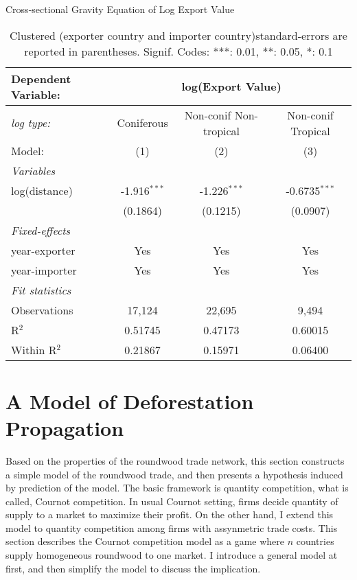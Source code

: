 \documentclass[a4paper,12pt]{article}
\begin{document}
   \begin{table}[htbp]
    \caption{Cross-sectional Gravity Equation of Log Export Value}
    \centering
    \begin{tabular}{lccc}
       \tabularnewline \midrule \midrule
       Dependent Variable: & \multicolumn{3}{c}{log(Export Value)}\\
       \midrule
       \textit{log type: } & Coniferous & Non-conif Non-tropical & Non-conif Tropical\\
       Model:                             & (1)            & (2)            & (3)\\  
       \midrule
       \emph{Variables}\\
       log(distance)                         & -1.916$^{***}$ & -1.226$^{***}$ & -0.6735$^{***}$\\   
       & (0.1864)       & (0.1215)       & (0.0907)\\   
        \midrule
        \emph{Fixed-effects}\\
        year-exporter  & Yes            & Yes            & Yes\\  
        year-importer   & Yes            & Yes            & Yes\\  
        \midrule
        \emph{Fit statistics}\\
        Observations                       & 17,124         & 22,695         & 9,494\\  
        R$^2$                              & 0.51745        & 0.47173        & 0.60015\\  
        Within R$^2$                       & 0.21867        & 0.15971        & 0.06400\\  
        \midrule \midrule
    \end{tabular}
    \caption*{\small{Clustered (exporter country and importer country)standard-errors are reported in parentheses. Signif. Codes: ***: 0.01, **: 0.05, *: 0.1}}
 \end{table}

\section{A Model of Deforestation Propagation}
Based on the properties of the roundwood trade network, this section constructs a simple model of the roundwood trade, and then presents a hypothesis induced by prediction of the model. The basic framework is quantity competition, what is called, Cournot competition. In usual Cournot setting, firms decide quantity of supply to a market to maximize their profit. On the other hand, I extend this model to quantity competition among firms with assynmetric trade costs. This section describes the Cournot competition model as a game where $n$ countries supply homogeneous roundwood to one market. I introduce a general model at first, and then simplify the model to discuss the implication. \\
\end{document}
